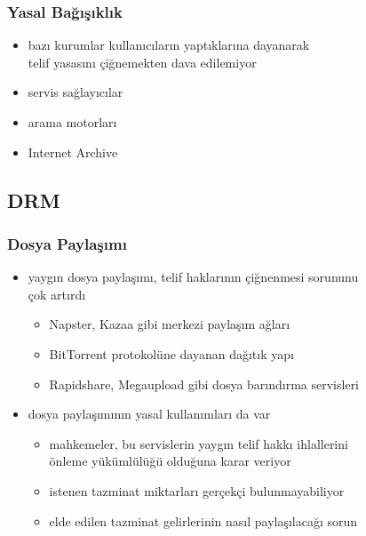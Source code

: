 \documentclass[dvipsnames]{beamer}
\theoremstyle{definition}
\theoremstyle{example}
\theoremstyle{plain}
\begin{document}
\begin{frame}
  \frametitle{Yasal Bağışıklık}

  \begin{itemize}
    \item bazı kurumlar kullanıcıların yaptıklarına dayanarak\\
      telif yasasını çiğnemekten dava edilemiyor

    \medskip
    \item servis sağlayıcılar
    \item arama motorları
    \item Internet Archive
  \end{itemize}
\end{frame}

\subsection{DRM}

\begin{frame}
  \frametitle{Dosya Paylaşımı}

  \begin{itemize}
    \item yaygın dosya paylaşımı, telif haklarının çiğnenmesi sorununu\\
      çok artırdı
    \begin{itemize}
      \item Napster, Kazaa gibi merkezi paylaşım ağları
      \item BitTorrent protokolüne dayanan dağıtık yapı
      \item Rapidshare, Megaupload gibi dosya barındırma servisleri
    \end{itemize}

    \pause
    \medskip
    \item dosya paylaşımının yasal kullanımları da var
    \begin{itemize}
      \item mahkemeler, bu servislerin yaygın telif hakkı ihlallerini\\
        önleme yükümlülüğü olduğuna karar veriyor
      \item istenen tazminat miktarları gerçekçi bulunmayabiliyor
      \item elde edilen tazminat gelirlerinin nasıl paylaşılacağı sorun
    \end{itemize}
  \end{itemize}
\end{frame}
\end{document}
